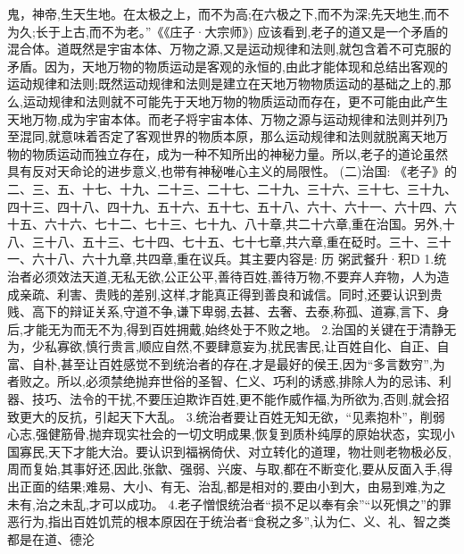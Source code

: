 \documentclass[a4paper,12pt,UTF8,twoside]{ctexbook}
\begin{document}
鬼，神帝,生天生地。在太极之上，而不为高;在六极之下,而不为深;先天地生,而不为久;长于上古,而不为老。”《《庄子·大宗师》)
应该看到,老子的道又是一个矛盾的混合体。道既然是宇宙本体、万物之源,又是运动规律和法则,就包含着不可克服的矛盾。因为，天地万物的物质运动是客观的永恒的,由此才能体现和总结出客观的运动规律和法则;既然运动规律和法则是建立在天地万物物质运动的基础之上的,那么,运动规律和法则就不可能先于天地万物的物质运动而存在，更不可能由此产生天地万物,成为宇宙本体。而老子将宇宙本体、万物之源与运动规律和法则并列乃至混同,就意味着否定了客观世界的物质本原，那么运动规律和法则就脱离天地万物的物质运动而独立存在，成为一种不知所出的神秘力量。所以,老子的道论虽然具有反对天命论的进步意义,也带有神秘唯心主义的局限性。
(二)治国:
《老子》的二、三、五、十七、十九、二十三、二十七、二十九、三十六、三十七、三十九、四十三、四十八、四十九、五十六、五十七、五十八、六十、六十一、六十四、六十五、六十六、七十二、七十三、七十九、八十章,共二十六章,重在治国。另外,十八、三十八、五十三、七十四、七十五、七十七章,共六章,重在砭时。三十、三十一、六十八、六十九章,共四章,重在议兵。其主要内容是:
历
粥武餐升·积D
1.统治者必须效法天道,无私无欲,公正公平,善待百姓,善待万物,不要弃人弃物，人为造成亲疏、利害、贵贱的差别,这样,才能真正得到善良和诚信。同时,还要认识到贵贱、高下的辩证关系,守道不争,谦下卑弱,去甚、去奢、去泰,称孤、道寡,言下、身后,才能无为而无不为,得到百姓拥戴,始终处于不败之地。
2.治国的关键在于清静无为，少私寡欲,慎行贵言,顺应自然,不要肆意妄为,扰民害民,让百姓自化、自正、自富、自朴,甚至让百姓感觉不到统治者的存在,才是最好的侯王,因为“多言数穷”,为者败之。所以,必须禁绝抛弃世俗的圣智、仁义、巧利的诱惑,排除人为的忌讳、利器、技巧、法令的干扰,不要压迫欺诈百姓,更不能作威作福,为所欲为,否则,就会招致更大的反抗，引起天下大乱。
3.统治者要让百姓无知无欲，“见素抱朴”，削弱心志,强健筋骨,抛弃现实社会的一切文明成果,恢复到质朴纯厚的原始状态，实现小国寡民,天下才能大治。要认识到福祸倚伏、对立转化的道理，物壮则老物极必反,周而复始,其事好还,因此,张歙、强弱、兴废、与取,都在不断变化,要从反面入手,得出正面的结果;难易、大小、有无、治乱,都是相对的,要由小到大，由易到难,为之未有,治之未乱,才可以成功。
4.老子憎恨统治者“损不足以奉有余”“以死惧之”的罪恶行为,指出百姓饥荒的根本原因在于统治者“食税之多”,认为仁、义、礼、智之类都是在道、德沦
\end{document}
